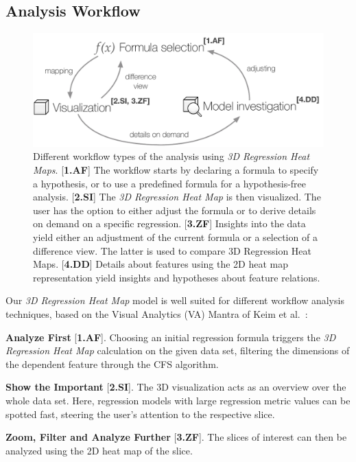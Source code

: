 \documentclass[journal]{style/vgtc} 			          %
\begin{document}
\subsection{Analysis Workflow} \label{sec:Workflow}
\begin{figure}[htb]
 \centering
 \includegraphics[width=1.0\linewidth]{figures/workflow}
 \caption{
 Different workflow types of the analysis using \emph{3D Regression Heat Maps}.
 [\textbf{1.AF}] The workflow starts by declaring a formula to specify a hypothesis, or to use a predefined formula for a hypothesis-free analysis.
 [\textbf{2.SI}] The \emph{3D Regression Heat Map} is then visualized.
 The user has the option to either adjust the formula or to derive details on demand on a specific regression.
 [\textbf{3.ZF}] Insights into the data yield either an adjustment of the current formula or a selection of a difference view.
 The latter is used to compare 3D Regression Heat Maps.
 [\textbf{4.DD}] Details about features using the 2D heat map representation yield insights and hypotheses about feature relations.
 }
  \label{fig:Workflow}
\end{figure}
\noindent Our \emph{3D Regression Heat Map} model is well suited for different workflow analysis techniques, based on the Visual Analytics (VA) Mantra of Keim et al.~\cite{Keim}:

\textbf{Analyze First} [\textbf{1.AF}]. Choosing an initial regression formula triggers the \emph{3D Regression Heat Map} calculation on the given data set, filtering the dimensions of the dependent feature through the CFS algorithm.

\textbf{Show the Important} [\textbf{2.SI}]. The 3D visualization acts as an overview over the whole data set.
Here, regression models with large regression metric values can be spotted fast, steering the user's attention to the respective slice.

\textbf{Zoom, Filter and Analyze Further} [\textbf{3.ZF}]. The slices of interest can then be analyzed using the 2D heat map of the slice.
\end{document}
